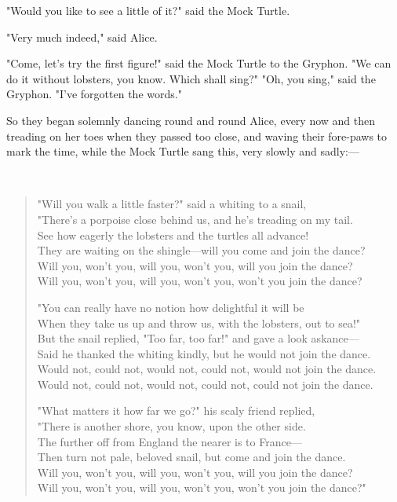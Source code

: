 "Would you like to see a little of it?" said the Mock Turtle.

"Very much indeed," said Alice.

"Come, let's try the first figure!" said the Mock Turtle to the Gryphon. "We can do it without lobsters, you know. Which shall sing?"
​
"Oh, you sing," said the Gryphon. "I've forgotten the words."

So they began solemnly dancing round and round Alice, every now and then treading on her toes when they passed too close, and waving their fore-paws to mark the time, while the Mock Turtle sang this, very slowly and sadly:—

​\begin{quote}
"Will you walk a little faster?" said a whiting to a snail,\\
"There's a porpoise close behind us, and he's treading on my tail.\\
See how eagerly the lobsters and the turtles all advance!\\
They are waiting on the shingle—will you come and join the dance?\\
⁠Will you, won't you, will you, won't you, will you join the dance?\\
⁠Will you, won't you, will you, won't you, won't you join the dance?

"You can really have no notion how delightful it will be\\
When they take us up and throw us, with the lobsters, out to sea!"\\
But the snail replied, "Too far, too far!" and gave a look askance—\\
Said he thanked the whiting kindly, but he would not join the dance.\\
⁠Would not, could not, would not, could not, would not join the dance.\\
⁠Would not, could not, would not, could not, could not join the dance.

"What matters it how far we go?" his scaly friend replied,\\
"There is another shore, you know, upon the other side.\\
The further off from England the nearer is to France—\\
Then turn not pale, beloved snail, but come and join the dance.\\
⁠Will you, won't you, will you, won't you, will you join the dance?\\
⁠Will you, won't you, will you, won't you, won't you join the dance?"
\end{quote}


